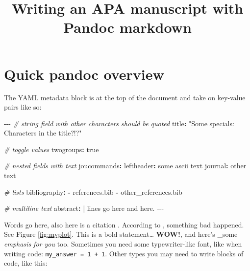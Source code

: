 \documentclass[\pandocDocMode,longtable,noextraspace,floatsintext]{apa6}
\title{Writing an APA manuscript with Pandoc markdown}
\newenvironment{Shaded}{}{}
\newcommand{\AttributeTok}[1]{\textcolor[rgb]{0.49,0.56,0.16}{#1}}
\newcommand{\CharTok}[1]{\textcolor[rgb]{0.25,0.44,0.63}{#1}}
\newcommand{\CommentTok}[1]{\textcolor[rgb]{0.38,0.63,0.69}{\textit{#1}}}
\newcommand{\FunctionTok}[1]{\textcolor[rgb]{0.02,0.16,0.49}{#1}}
\newcommand{\KeywordTok}[1]{\textcolor[rgb]{0.00,0.44,0.13}{\textbf{#1}}}
\newcommand{\NormalTok}[1]{#1}
\newcommand{\PreprocessorTok}[1]{\textcolor[rgb]{0.74,0.48,0.00}{#1}}
\newcommand{\StringTok}[1]{\textcolor[rgb]{0.25,0.44,0.63}{#1}}
\begin{document}
\maketitle

\hypertarget{quick-pandoc-overview}{%
\section{Quick pandoc overview}\label{quick-pandoc-overview}}

The YAML metadata block is at the top of the document and take on
key-value pairs like so:

\begin{Shaded}
\begin{Highlighting}[]
\PreprocessorTok{{-}{-}{-}}
\CommentTok{\# string field with other characters should be quoted}
\FunctionTok{title}\KeywordTok{:}\AttributeTok{ }\StringTok{"Some specials: Characters in the title?!?"}

\CommentTok{\# toggle values}
\FunctionTok{twogroups}\KeywordTok{:}\AttributeTok{ }\CharTok{true}

\CommentTok{\# nested fields with text}
\FunctionTok{joucommands}\KeywordTok{:}
\AttributeTok{    }\FunctionTok{leftheader}\KeywordTok{:}\AttributeTok{ some ascii text}
\AttributeTok{    }\FunctionTok{journal}\KeywordTok{:}\AttributeTok{ other text}

\CommentTok{\# lists}
\FunctionTok{bibliography}\KeywordTok{:}
\AttributeTok{    }\KeywordTok{{-}}\AttributeTok{ references.bib}
\AttributeTok{    }\KeywordTok{{-}}\AttributeTok{ other\_references.bib}

\CommentTok{\# multiline text}
\FunctionTok{abstract}\KeywordTok{: }\CharTok{|}
\NormalTok{    lines go here}
\NormalTok{    and here.}
\PreprocessorTok{{-}{-}{-}}
\end{Highlighting}
\end{Shaded}

Words go here, also here is a citation \autocite{someArticle}. According
to \textcite{anotherArticle}, something bad happened. See Figure
\ref{fig:myplot}. This is a bold statement\ldots{} \textbf{WOW!}, and
here's \_some \emph{emphasis for you} too. Sometimes you need some
typewriter-like font, like when writing code:
\texttt{my\_answer\ =\ 1\ +\ 1}. Other types you may need to write
blocks of code, like this:
\end{document}
